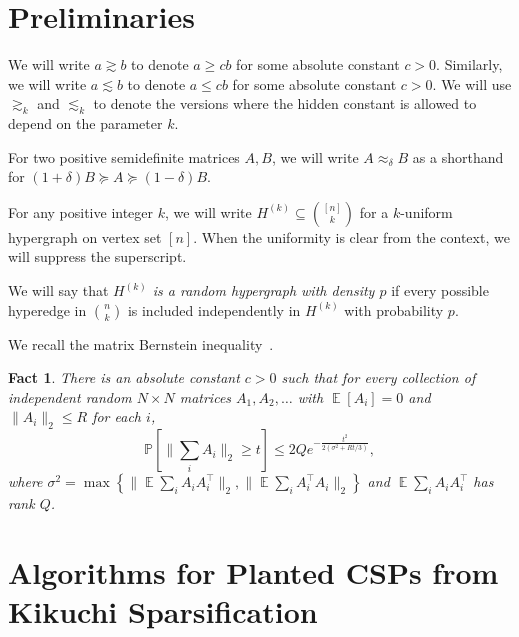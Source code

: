 \documentclass
[11pt,letterpaper]
{article}
\providecommand*{\E}{\mathop{\mathbb{E}}}
\renewcommand{\Pr}{\mathbb P}
\newtheorem{fact}[theorem]{Fact}
\begin{document}



\section{Preliminaries}
We will write $a \gtrsim b$ to denote $a \geq cb$ for some absolute constant $c>0$. Similarly, we will write $a \lesssim b$ to denote $a \leq cb$ for some absolute constant $c>0$. We will use $\gtrsim_k$ and $\lesssim_k$ to denote the versions where the hidden constant is allowed to depend on the parameter $k$. 

For two positive semidefinite matrices $A,B$, we will write $A \approx_{\delta} B$ as a shorthand for $(1+\delta)B \succeq A\succeq (1-\delta) B$. 

For any positive integer $k$, we will write $H^{(k)} \subseteq {[n] \choose k}$ for a $k$-uniform hypergraph on vertex set $[n]$. When the uniformity is clear from the context, we will suppress the superscript. 

We will say that \emph{$H^{(k)}$ is a random hypergraph with density $p$} if every possible hyperedge in ${n \choose k}$ is included independently in $H^{(k)}$ with probability $p$.

We recall the matrix Bernstein inequality~\cite{Tropp15}.

\begin{fact}
There is an absolute constant $c>0$ such that for every collection of independent random $N \times N$ matrices $A_1, A_2, \ldots$ with $\E[ A_i] = 0$ and $\|A_i\|_2 \leq R$ for each $i$,
\[
\Pr[ \|\sum_i A_i \|_2 \geq t ] \leq 2Q e^{-\frac{t^2}{2(\sigma^2 + Rt/3)}},
\]
where $\sigma^2 = \max\left\{ \|\E\sum_i A_i A_i^{\top}\|_2, \|\E\sum_i A_i^{\top} A_i\|_2  \right \}$ and $\E\sum_i A_i A_i^{\top}$ has rank $Q$.
\end{fact}



\section{Algorithms for Planted CSPs from Kikuchi Sparsification}
\end{document}
